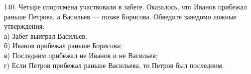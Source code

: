 140. Четыре спортсмена участвовали в забеге. Оказалось, что Иванов прибежал раньше Петрова, а Васильев --- позже Борисова. Обведите заведомо ложные утверждения:\\
а) Забег выиграл Васильев;\\
б) Иванов прибежал раньше Борисова;\\
в) Последним прибежал не Иванов и не Васильев;\\
г) Если Петров прибежал раньше Васильева, то Петров был последним.\\
